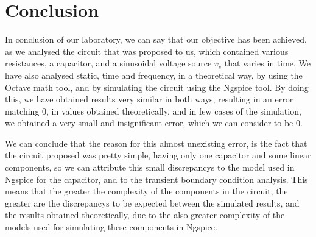\section{Conclusion} 
\label{sec:conclusion}

In conclusion of our laboratory, we can say that our objective has been achieved, as we analysed the circuit that was proposed to us, which contained various resistances, a capacitor, and a sinusoidal voltage source $v_s$ that varies in time. We have also analysed static, time and frequency, in a theoretical way, by using the Octave math tool, and by simulating the circuit using the Ngspice tool. By doing this, we have obtained results very similar in both ways, resulting in an error matching 0, in values obtained theoretically, and in few cases of the simulation, we obtained a very small and insignificant error, which we can consider to be 0.
\par
We can conclude that the reason for this almost unexisting error, is the fact that the circuit proposed was pretty simple, having only one capacitor and some linear components, so we can attribute this small discrepancys to the model used in Ngspice for the capacitor, and to the transient boundary condition analysis. This means that the greater the complexity of the components in the circuit, the greater are the discrepancys to be expected between the simulated results, and the results obtained theoretically, due to the also greater complexity of the models used for simulating these components in Ngspice.
